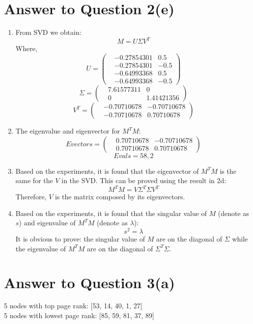 \documentclass[11pt]{article}
\begin{document}
\section*{Answer to Question 2(e)}
\begin{enumerate}
\item
From SVD we obtain:
\begin{equation*}
    M = U\Sigma V^T
\end{equation*}
Where,
$$
U =
\begin{pmatrix}
    &-0.27854301 & 0.5\\
    &-0.27854301 & -0.5\\
    &-0.64993368 & 0.5\\
    &-0.64993368 & -0.5
\end{pmatrix}
$$
$$
\Sigma =
\begin{pmatrix}
    &7.61577311 & 0\\
    &0 & 1.41421356
\end{pmatrix}
$$
$$
V^T =
\begin{pmatrix}
    & -0.70710678 & -0.70710678\\
    & -0.70710678 & 0.70710678
\end{pmatrix}
$$
\item
The eigenvalue and eigenvector for $M^TM$:
$$
Evectors =
\begin{pmatrix}
    & 0.70710678 & -0.70710678\\
    & 0.70710678 & 0.70710678
\end{pmatrix}
$$
$$
    Evals = 58, 2
$$

\item
Based on the experiments, it is found that the eigenvector of $M^TM$ is the same for the $V$ in the SVD.
This can be proved using the result in 2d:
$$
    M^TM = V\Sigma^T\Sigma V^T
$$
Therefore, $V$ is the matrix composed by its eigenvectors.

\item
Based on the experiments, it is found that the singular value of $M$ (denote as $s$) and eigenvalue of $M^TM$ (denote as $\lambda$):
\begin{equation}
    s^2 = \lambda
\end{equation}
It is obvious to prove: the singular value of $M$ are on the diagonal of $\Sigma$ while the eigenvalue of $M^TM$ are on the diagonal of $\Sigma^T\Sigma$.

\end{enumerate}

\pagebreak[4]
\section*{Answer to Question 3(a)}
5 nodes with top page rank: [53, 14, 40, 1, 27]\\
5 nodes with lowest page rank: [85, 59, 81, 37, 89]
\end{document}
